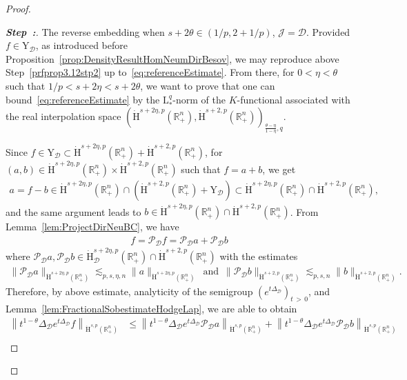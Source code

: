 \documentclass[10pt]{amsart}
\theoremstyle{definition}\newtheorem{defi}[theo]{Definition}\newtheorem{rema}[theo]{Remark}\newtheorem{exam}[theo]{Example}\newtheorem{exem}[theo]{Example}\newtheorem{nota}[theo]{Notation}
\newcommand{\bbR}{\mathbb{R}}
\newcommand{\rmH}{\mathrm{H}}%
\newcommand{\rmL}{\mathrm{L}}
\newcommand{\rmY}{\mathrm{Y}}
\newcommand{\clJ}{\mathcal{J}}
\newcommand{\clD}{\mathcal{D}}
\newcommand{\clP}{\mathcal{P}}
\newcounter{stepcount}
\newenvironment{step}{\refstepcounter{stepcount}\begin{proof}[\textbf{Step~\thestepcount:}]}{\let\qed\relax\end{proof}}
\begin{document}
\begin{proof}
\begin{step}\label{prfprop3.12stp3}
The reverse embedding when $s+2\theta\in(1/p,2+1/p)$, $\clJ=\clD$. Provided $f\in \rmY_\clD$, as introduced before Proposition~\ref{prop:DensityResultHomNeumDirBesov}, we may reproduce above Step~\ref{prfprop3.12stp2} up to~\eqref{eq:referenceEstimate}. From there, for $0<\eta<\theta$ such that $1/p<s+2\eta<s+2\theta$, we want to prove that one can bound~\eqref{eq:referenceEstimate} by the $\rmL^q_\ast$-norm of the $K$-functional associated with the real interpolation space $(\dot{\rmH}^{s+2\eta,p}(\bbR^n_+),\dot{\rmH}^{s+2,p}(\bbR^n_+))_{\frac{\theta-\eta}{1-\eta},q}$.

Since $f\in\rmY_\clD\subset\dot{\rmH}^{s+2\eta,p}(\bbR^n_+)+\dot{\rmH}^{s+2,p}(\bbR^n_+)$, for $(a,b)\in\dot{\rmH}^{s+2\eta,p}(\bbR^n_+)\times\dot{\rmH}^{s+2,p}(\bbR^n_+)$ such that $f=a+b$, we get
\begin{align*}
a=f-b \in \dot{\rmH}^{s+2\eta,p}\left(\bbR^n_+\right)\cap(\dot{\rmH}^{s+2,p}\left(\bbR^n_+\right)+\rmY_\clD) \subset \dot{\rmH}^{s+2\eta,p}\left(\bbR^n_+\right)\cap\dot{\rmH}^{s+2,p}\left(\bbR^n_+\right),
\end{align*}
and the same argument leads to $b \in \dot{\rmH}^{s+2\eta,p}(\bbR^n_+)\cap\dot{\rmH}^{s+2,p}(\bbR^n_+)$. From Lemma~\ref{lem:ProjectDirNeuBC}, we have
\begin{align*}
f = \clP _\clD f = \clP _\clD a + \clP _\clD b
\end{align*}
where $\clP _\clD a,\clP _\clD b\in \dot{\rmH}^{s+2\eta,p}_\clD(\bbR^n_+)\cap\dot{\rmH}^{s+2,p}(\bbR^n_+)$ with the estimates
\begin{align*}
\| \clP _\clD a\|_{\dot{\rmH}^{s+2\eta,p}\left(\bbR^n_+\right)}\lesssim_{p,s,\eta,n} \| a \|_{\dot{\rmH}^{s+2\eta,p}\left(\bbR^n_+\right)}\,\text{ and }\,\| \clP _\clD b\|_{\dot{\rmH}^{s+2,p}\left(\bbR^n_+\right)}\lesssim_{p,s,n} \| b \|_{\dot{\rmH}^{s+2,p}\left(\bbR^n_+\right)}.
\end{align*}
Therefore, by above estimate, analyticity of the semigroup $(e^{t\Delta_{\clD}})_{t\,>\,0}$, and Lemma~\ref{lem:FractionalSobestimateHodgeLap}, we are able to obtain
\begin{align*}
\left\| t^{1-\theta} \Delta_{\clD}e^{t\Delta_{\clD}} f\right\|_{\dot{\rmH}^{s,p}\left(\bbR^n_+\right)} &\leqslant \left\| t^{1-\theta} \Delta_{\clD}e^{t\Delta_{\clD}} \clP _\clD {a}\right\|_{\dot{\rmH}^{s,p}\left(\bbR^n_+\right)} + \left\| t^{1-\theta} \Delta_{\clD}e^{t\Delta_{\clD}} \clP _\clD {b}\right\|_{\dot{\rmH}^{s,p}\left(\bbR^n_+\right)}\\

\end{align*}
\end{step}
\end{proof}
\end{document}
